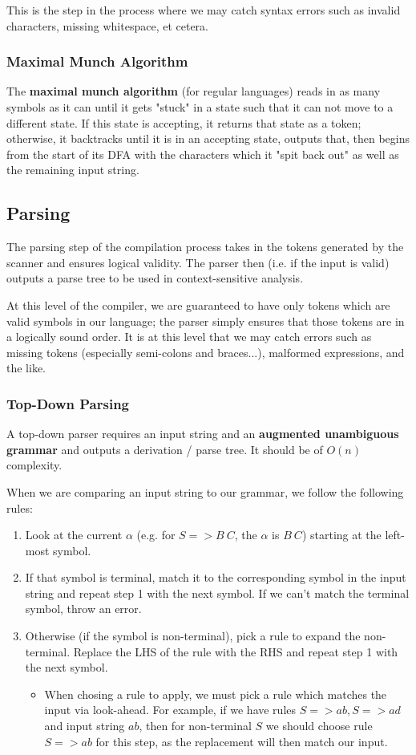 \documentclass[12pt]{article}
\begin{document}
This is the step in the process where we may catch syntax errors such as invalid characters, missing whitespace, et cetera.

\subsubsection*{Maximal Munch Algorithm}
The {\bf maximal munch algorithm} (for regular languages) reads in as many symbols as it can until it gets "stuck" in a state such that it can not move to a different state. If this state is accepting, it returns that state as a token; otherwise, it backtracks until it is in an accepting state, outputs that, then begins from the start of its DFA with the characters which it "spit back out" as well as the remaining input string.

\subsection*{Parsing}
The parsing step of the compilation process takes in the tokens generated by the scanner and ensures logical validity. The parser then (i.e. if the input is valid) outputs a parse tree to be used in context-sensitive analysis.

At this level of the compiler, we are guaranteed to have only tokens which are valid symbols in our language; the parser simply ensures that those tokens are in a logically sound order. It is at this level that we may catch errors such as missing tokens (especially semi-colons and braces...), malformed expressions, and the like.

\subsubsection*{Top-Down Parsing}
A top-down parser requires an input string and an {\bf augmented unambiguous grammar} and outputs a derivation / parse tree. It should be of $O(n)$ complexity.

When we are comparing an input string to our grammar, we follow the following rules:
\begin{enumerate}
\item Look at the current $\alpha$ (e.g. for $S => B\ C$, the $\alpha$ is $B\ C$) starting at the left-most symbol.
\item If that symbol is terminal, match it to the corresponding symbol in the input string and repeat step 1 with the next symbol. If we can't match the terminal symbol, throw an error.
\item Otherwise (if the symbol is non-terminal), pick a rule to expand the non-terminal. Replace the LHS of the rule with the RHS and repeat step 1 with the next symbol.
\begin{itemize}
\item When chosing a rule to apply, we must pick a rule which matches the input via look-ahead. For example, if we have rules $S => ab, S => ad$ and input string $ab$, then for non-terminal $S$ we should choose rule $S => ab$ for this step, as the replacement will then match our input.
\end{itemize}
\end{enumerate}
\end{document}
